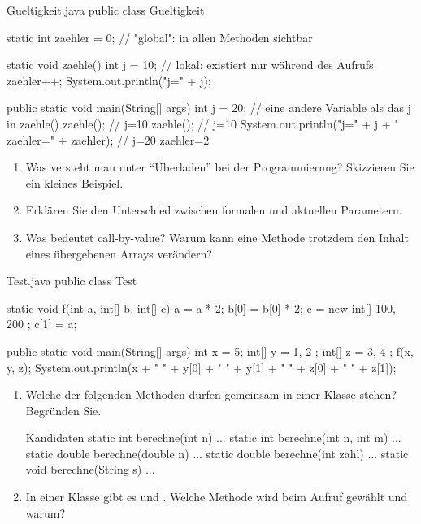 \begin{javacode}{Gueltigkeit.java}
public class Gueltigkeit {
	static int zaehler = 0;                 // "global": in allen Methoden sichtbar

	static void zaehle() {
		int j = 10;                         // lokal: existiert nur während des Aufrufs
		zaehler++;
		System.out.println("j=" + j);
	}

	public static void main(String[] args) {
		int j = 20;                         // eine andere Variable als das j in zaehle()
		zaehle();                           // j=10
		zaehle();                           // j=10
		System.out.println("j=" + j + " zaehler=" + zaehler);       // j=20 zaehler=2
	}
}
\end{javacode}

\aufgaben
{}
\begin{enumerate}[label=\alph*)]
\item Was versteht man unter \enquote{Überladen} bei der Programmierung? Skizzieren Sie ein kleines Beispiel.
\item Erklären Sie den Unterschied zwischen formalen und aktuellen Parametern.
\item Was bedeutet call-by-value? Warum kann eine Methode trotzdem den Inhalt eines übergebenen Arrays verändern?
\end{enumerate}

\begin{javacode}{Test.java}
public class Test {
	static void f(int a, int[] b, int[] c) {
		a = a * 2;
		b[0] = b[0] * 2;
		c = new int[] { 100, 200 };
		c[1] = a;
	}

	public static void main(String[] args) {
		int x = 5;
		int[] y = { 1, 2 };
		int[] z = { 3, 4 };
		f(x, y, z);
		System.out.println(x + " " + y[0] + " " + y[1] + " " + z[0] + " " + z[1]);
	}
}
\end{javacode}

\begin{enumerate}[label=\alph*)]
\item Welche der folgenden Methoden dürfen gemeinsam in einer Klasse stehen? Begründen Sie.
\begin{javacode}[Ausschnitt]{Kandidaten}
static int berechne(int n) { ... }
static int berechne(int n, int m) { ... }
static double berechne(double n) { ... }
static double berechne(int zahl) { ... }
static void berechne(String s) { ... }
\end{javacode}
\item In einer Klasse gibt es  und . Welche Methode wird beim Aufruf  gewählt und warum?
\end{enumerate}

